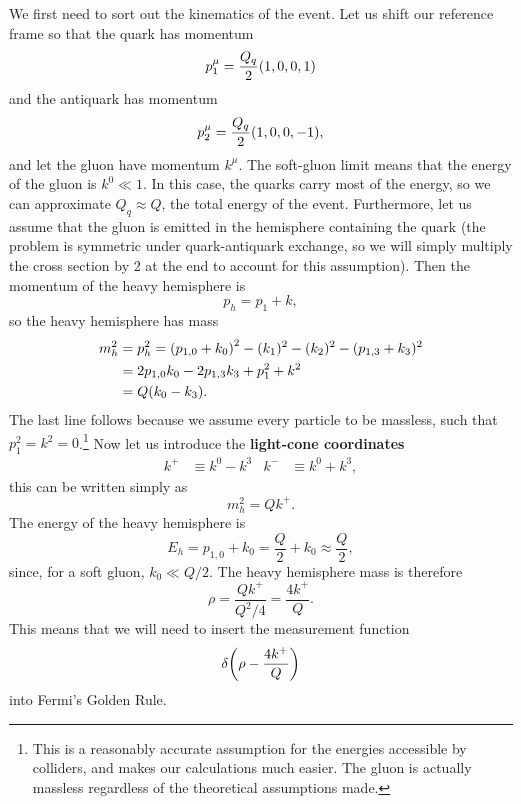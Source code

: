 \documentclass[../thesis.tex]{subfiles}
\begin{document}
	We first need to sort out the kinematics of the event. Let us shift our reference frame so that the quark has momentum
	\begin{equation}
		p_1^\mu = \frac{Q_q}{2}\qty(1, 0, 0, 1)
	\end{equation}
	and the antiquark has momentum
	\begin{equation}
		p_2^\mu = \frac{Q_q}{2}\qty(1, 0, 0, -1),
	\end{equation}
	and let the gluon have momentum $k^\mu$. The soft-gluon limit means that the energy of the gluon is $k^0 \ll 1$. In this case, the quarks carry most of the energy, so we can approximate $Q_q \approx Q$, the total energy of the event. Furthermore, let us assume that the gluon is emitted in the hemisphere containing the quark (the problem is symmetric under quark-antiquark exchange, so we will simply multiply the cross section by $2$ at the end to account for this assumption). Then the momentum of the heavy hemisphere is
	\begin{equation}
		p_h = p_1 + k,
	\end{equation}
	so the heavy hemisphere has mass
	\begin{equation}
	\begin{aligned}
		m_h^2 &= p_h^2 = \qty(p_{1, 0} + k_0)^2 - (k_1)^2 - (k_2)^2 - (p_{1, 3} + k_3)^2 \\
		&= 2p_{1, 0}k_0 - 2p_{1, 3}k_3 + p_1^2 + k^2 \\
		&= Q(k_0 - k_3).
	\end{aligned}
	\end{equation}
	The last line follows because we assume every particle to be massless, such that $p_1^2 = k^2 = 0$.\footnote{This is a reasonably accurate assumption for the energies accessible by colliders, and makes our calculations much easier. The gluon is actually massless regardless of the theoretical assumptions made.} Now let us introduce the \textbf{light-cone coordinates}
	\begin{align}
		k^+ &\equiv k^0 - k^3 & k^- &\equiv k^0 + k^3,
	\end{align}
	this can be written simply as
	\begin{equation}
		m_h^2 = Q k^+.
	\end{equation}
	The energy of the heavy hemisphere is
	\begin{equation}
		E_h = p_{1, 0} + k_0 = \frac{Q}{2} + k_0 \approx \frac{Q}{2},
	\end{equation}
	since, for a soft gluon, $k_0 \ll Q/2$. The heavy hemisphere mass is therefore
	\begin{equation}\label{leading-eq:soft mass}
		\rho = \frac{Q k^+}{Q^2 / 4} = \frac{4k^+}{Q}.
	\end{equation}
	This means that we will need to insert the measurement function
	\begin{equation}
		\delta\qty(\rho - \frac{4k^+}{Q})
	\end{equation}
	into Fermi's Golden Rule.
\end{document}
